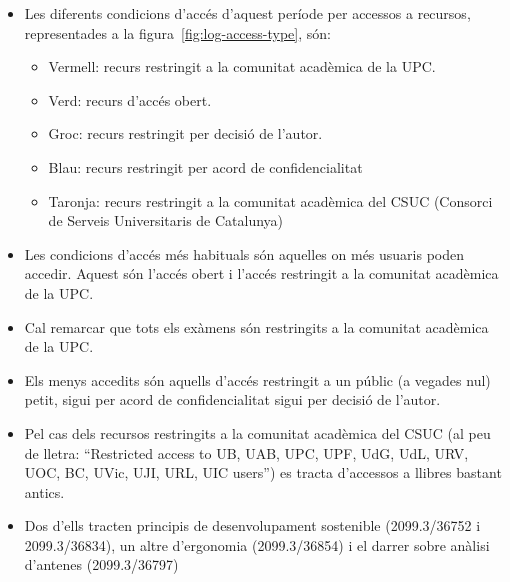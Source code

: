 \begin{itemize}
    \item Les diferents condicions d'accés d'aquest període per accessos a recursos, representades a la figura~\ref{fig:log-access-type}, són:
    \begin{itemize}
        \item Vermell: recurs restringit a la comunitat acadèmica de la UPC.
        \item Verd: recurs d'accés obert.
        \item Groc: recurs restringit per decisió de l'autor.
        \item Blau: recurs restringit per acord de confidencialitat
        \item Taronja: recurs restringit a la comunitat acadèmica del CSUC (Consorci de Serveis Universitaris de Catalunya)
    \end{itemize}

    \item Les condicions d'accés més habituals són aquelles on més usuaris poden accedir.
    Aquest són l'accés obert i l'accés restringit a la comunitat acadèmica de la UPC.
    \item Cal remarcar que tots els exàmens són restringits a la comunitat acadèmica de la UPC.
    \item Els menys accedits són aquells d'accés restringit a un públic (a vegades nul) petit, sigui per acord de confidencialitat sigui per decisió de l'autor.
    \clearpage
    \item Pel cas dels recursos restringits a la comunitat acadèmica del CSUC (al peu de lletra: “Restricted access to UB, UAB, UPC, UPF, UdG, UdL, URV, UOC, BC, UVic, UJI, URL, UIC users”) es tracta d'accessos a llibres bastant antics.
    \item Dos d'ells tracten principis de desenvolupament sostenible (2099.3/36752 i 2099.3/36834), un altre d'ergonomia (2099.3/36854) i el darrer sobre anàlisi d'antenes (2099.3/36797)

\end{itemize}